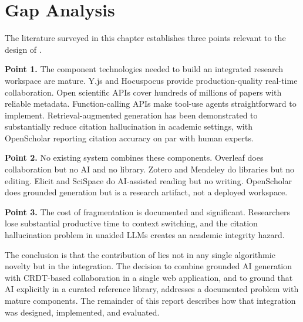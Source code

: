 \section{Gap Analysis}
\label{sec:lit-gap}

The literature surveyed in this chapter establishes three points relevant to the design of \sh{}.

\textbf{Point 1.} The component technologies needed to build an integrated research workspace are mature. Y.js and Hocuspocus provide production-quality real-time collaboration. Open scientific APIs cover hundreds of millions of papers with reliable metadata. Function-calling APIs make tool-use agents straightforward to implement. Retrieval-augmented generation has been demonstrated to substantially reduce citation hallucination in academic settings, with OpenScholar reporting citation accuracy on par with human experts.

\textbf{Point 2.} No existing system combines these components. Overleaf does collaboration but no AI and no library. Zotero and Mendeley do libraries but no editing. Elicit and SciSpace do AI-assisted reading but no writing. OpenScholar does grounded generation but is a research artifact, not a deployed workspace.

\textbf{Point 3.} The cost of fragmentation is documented and significant. Researchers lose substantial productive time to context switching, and the citation hallucination problem in unaided LLMs creates an academic integrity hazard.

The conclusion is that the contribution of \sh{} lies not in any single algorithmic novelty but in the integration. The decision to combine grounded AI generation with CRDT-based collaboration in a single web application, and to ground that AI explicitly in a curated reference library, addresses a documented problem with mature components. The remainder of this report describes how that integration was designed, implemented, and evaluated.

